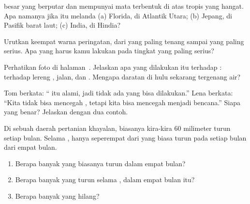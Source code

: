 \begin{exercise}[$\star$]\label{exo:g5:natural-hazards:5}
 besar yang berputar dan mempunyai mata terbentuk di atas  tropis
yang hangat. Apa namanya jika  itu melanda (a)  Florida, di
Atlantik Utara; (b) Jepang, di Pasifik barat laut; (c)  India, di
 Hindia?
\end{exercise}

\begin{exercise}[$\star$]\label{exo:g5:natural-hazards:6}
Urutkan keempat warna peringatan, dari yang paling tenang sampai yang
paling serius. Apa yang harus kamu lakukan pada tingkat yang paling serius?
\end{exercise}

\begin{exercise}[$\star\star$]\label{exo:g5:natural-hazards:7}
Perhatikan foto  di
halaman~\pageref{fig:g5:natural-hazards:landslide}. Jelaskan apa yang
dilakukan  itu terhadap : terhadap lereng , jalan,
dan . Mengapa daratan di hulu sekarang tergenang air?
\end{exercise}

\begin{exercise}[$\star\star$]\label{exo:g5:natural-hazards:8}
Tom berkata: `` itu alami, jadi tidak ada yang bisa dilakukan.'' Lena
berkata: ``Kita tidak bisa mencegah  , tetapi kita bisa mencegah
 menjadi bencana.'' Siapa yang benar? Jelaskan dengan dua contoh.
\end{exercise}

\begin{exercise}[$\star\star$]\label{exo:g5:natural-hazards:9}
Di sebuah daerah pertanian khayalan, biasanya kira-kira 60 milimeter 
turun setiap bulan. Selama , hanya seperempat dari  yang
biasa turun pada setiap bulan dari empat bulan.
\begin{enumerate}
  \item[(a)] Berapa banyak  yang biasanya turun dalam empat bulan?
  \item[(b)] Berapa banyak yang turun selama , dalam empat bulan itu?
  \item[(c)] Berapa banyak  yang hilang?
\end{enumerate}
\end{exercise}

